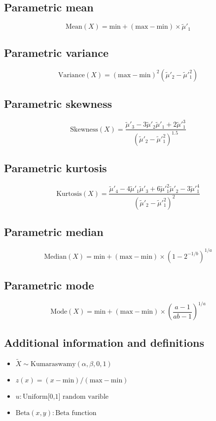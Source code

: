 \documentclass{article}
\begin{document}
\subsection{Parametric mean}
\begin{equation*} \mathrm{Mean}(X)=\text{min}+\left(\text{max}-\text{min}\right)\times \tilde{\mu}'_{1} \end{equation*}
\subsection{Parametric variance}
\begin{equation*} \mathrm{Variance}(X)=\left(\text{max}-\text{min}\right)^{2}(\tilde{\mu}'_{2}-\tilde{\mu}'^{2}_{1}) \end{equation*}
\subsection{Parametric skewness}
\begin{equation*} \mathrm{Skewness}(X)=\frac{\tilde{\mu}'_{3}-3\tilde{\mu}'_{2}\tilde{\mu}'_{1}+2\tilde{\mu}'^{3}_{1}}{(\tilde{\mu}'_{2}-\tilde{\mu}'^{2}_{1})^{1.5}} \end{equation*}
\subsection{Parametric kurtosis}
\begin{equation*} \mathrm{Kurtosis}(X)=\frac{\tilde{\mu}'_{4}-4\tilde{\mu}'_{1}\tilde{\mu}'_{3}+6\tilde{\mu}'^{2}_{1}\tilde{\mu}'_{2}-3\tilde{\mu}'^{4}_{1}}{(\tilde{\mu}'_{2}-\tilde{\mu}'^{2}_{1})^{2}} \end{equation*}
\subsection{Parametric median}
\begin{equation*} \mathrm{Median}(X)=\text{min}+\left(\text{max}-\text{min}\right)\times\left(1-2^{-1/b}\right)^{1/a} \end{equation*}
\subsection{Parametric mode}
\begin{equation*} \mathrm{Mode}(X)=\text{min}+\left(\text{max}-\text{min}\right)\times\left(\frac{a-1}{ab-1}\right)^{1/a} \end{equation*}
\subsection{Additional information and definitions}
\begin{itemize}
    \item $ \tilde{X}\sim\mathrm{Kumaraswamy}\left(\alpha,\beta,0,1\right) $
    \item $ z\left(x\right)=\left(x-\text{min}\right)/\left(\text{max}-\text{min}\right) $
    \item $ u:\text{Uniform[0,1] random varible} $
    \item $ \text{Beta}\left(x,y\right):\text{Beta function} $
\end{itemize}
\end{document}
